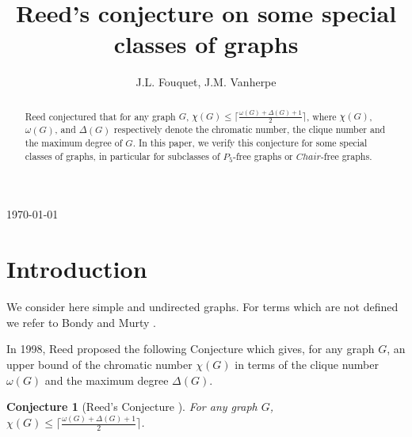 \documentclass{amsart}
\newtheorem{conj}[thm]{Conjecture}
\theoremstyle{definition}
\theoremstyle{remark}
\begin{document}
\title[]{Reed's conjecture on some special classes of graphs}
\author{J.L. Fouquet, J.M. Vanherpe }
\address{L.I.F.O., Facult\'e des Sciences, B.P. 6759 \\
Universit\'e d'Orl\'eans, 45067 Orl\'eans Cedex 2, FR}
 

\begin{abstract}

Reed  conjectured that for any graph $G$, $\chi(G) \leq \lceil \frac{\omega(G)+\Delta(G)+1}{2}\rceil$, 
where $\chi(G)$, $\omega(G)$, and $\Delta(G)$ respectively denote the chromatic number, the clique number and the maximum degree of $G$. 
In this paper, we verify this conjecture for some special classes of graphs, in particular for subclasses of $P_5$-free graphs or $Chair$-free graphs.
\end{abstract}

\maketitle
\begin{center}
\today
\end{center}

\section{Introduction}
We consider here simple and undirected graphs. For terms which are not defined we refer to Bondy and Murty \cite{BonMur08}.


In 1998, Reed proposed the following Conjecture which gives, for any graph $G$, an upper bound of the chromatic number $\chi(G)$ in terms of the clique number $\omega(G)$ and the maximum degree $\Delta(G)$.



\begin{conj}[Reed's Conjecture \cite{Ree1998}] \label{Conjecture:Reed1998} For any graph $G$, $\chi(G) \leq \lceil \frac{\omega(G)+\Delta(G)+1}{2}\rceil$.
\end{conj}
\end{document}
